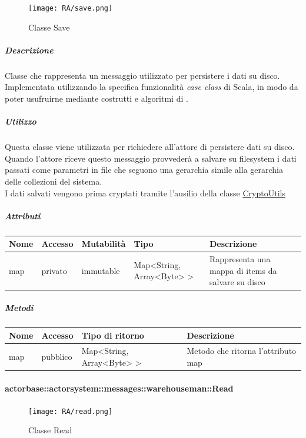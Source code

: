 \documentclass{scalatekids-article}
\begin{document}
\begin{figure}[H]
  \begin{center}
    \texttt{[image: RA/save.png]}
    \caption{Classe Save}
  \end{center}
\end{figure}

\subparagraph{Descrizione}
Classe che rappresenta un messaggio utilizzato per persistere i dati su disco.\\Implementata utilizzando la specifica funzionalità \textit{case class} di Scala,
in modo da poter usufruirne mediante costrutti e algoritmi di
.

\subparagraph{Utilizzo}
Questa classe viene utilizzata per richiedere all'attore di persistere dati
su disco. Quando l'attore riceve questo messaggio provvederà a salvare su
filesystem i dati passati come parametri in file che seguono una gerarchia
simile alla gerarchia delle collezioni del sistema.\\I dati salvati vengono prima cryptati tramite l'ausilio della classe \hyperref[sec:actorbase::actorsystem::utils::CryptoUtils]{CryptoUtils}

\subparagraph{Attributi}
\begin{tabular}{| p{2cm} | p{1.5cm} | p{2cm} | p{3cm} | p{8.5cm} |}
  \hline
  Nome & Accesso & Mutabilità & Tipo & Descrizione\\
  \hline
  map & privato & immutable & Map<String, Array<Byte> > & Rappresenta una mappa di items da salvare su disco\\
  \hline
\end{tabular}

\subparagraph{Metodi}
\begin{tabular}{| p{3cm} | p{1.5cm} | p{3.5cm} | p{9cm} |}
  \hline
  Nome & Accesso & Tipo di ritorno & Descrizione\\
  \hline
  map & pubblico & Map<String, Array<Byte> > & Metodo che ritorna l'attributo map\\
  \hline
\end{tabular}

\paragraph{actorbase::actorsystem::messages::warehouseman::Read}
\label{sec:actorbase::actorsystem::messages::warehouseman::Read}

\begin{figure}[H]
  \begin{center}
    \texttt{[image: RA/read.png]}
    \caption{Classe Read}
  \end{center}
\end{figure}
\end{document}

